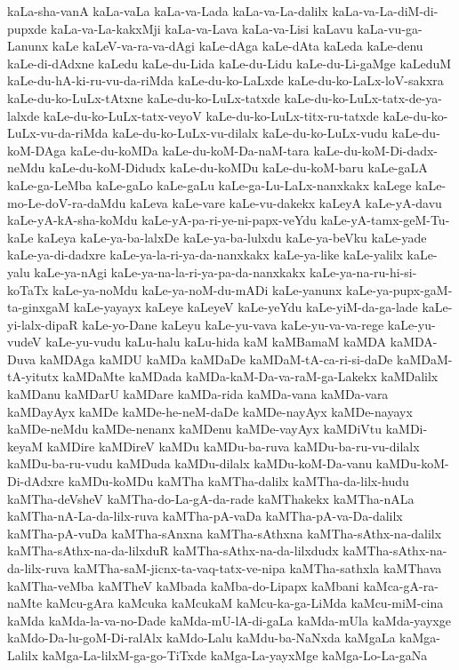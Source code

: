 {kaLa-sha-vanA
kaLa-vaLa
kaLa-va-Lada
kaLa-va-La-dalilx
kaLa-va-La-diM-di-pupxde
kaLa-va-La-kakxMji
kaLa-va-Lava
kaLa-va-Lisi
kaLavu
kaLa-vu-ga-Lanunx
kaLe
kaLeV-va-ra-va-dAgi
kaLe-dAga
kaLe-dAta
kaLeda
kaLe-denu
kaLe-di-dAdxne
kaLedu
kaLe-du-Lida
kaLe-du-Lidu
kaLe-du-Li-gaMge
kaLeduM
kaLe-du-hA-ki-ru-vu-da-riMda
kaLe-du-ko-LaLxde
kaLe-du-ko-LaLx-loV-sakxra
kaLe-du-ko-LuLx-tAtxne
kaLe-du-ko-LuLx-tatxde
kaLe-du-ko-LuLx-tatx-de-ya-lalxde
kaLe-du-ko-LuLx-tatx-veyoV
kaLe-du-ko-LuLx-titx-ru-tatxde
kaLe-du-ko-LuLx-vu-da-riMda
kaLe-du-ko-LuLx-vu-dilalx
kaLe-du-ko-LuLx-vudu
kaLe-du-koM-DAga
kaLe-du-koMDa
kaLe-du-koM-Da-naM-tara
kaLe-du-koM-Di-dadx-neMdu
kaLe-du-koM-Didudx
kaLe-du-koMDu
kaLe-du-koM-baru
kaLe-gaLA
kaLe-ga-LeMba
kaLe-gaLo
kaLe-gaLu
kaLe-ga-Lu-LaLx-nanxkakx
kaLege
kaLe-mo-Le-doV-ra-daMdu
kaLeva
kaLe-vare
kaLe-vu-dakekx
kaLeyA
kaLe-yA-davu
kaLe-yA-kA-sha-koMdu
kaLe-yA-pa-ri-ye-ni-papx-veYdu
kaLe-yA-tamx-geM-Tu-kaLe
kaLeya
kaLe-ya-ba-lalxDe
kaLe-ya-ba-lulxdu
kaLe-ya-beVku
kaLe-yade
kaLe-ya-di-dadxre
kaLe-ya-la-ri-ya-da-nanxkakx
kaLe-ya-like
kaLe-yalilx
kaLe-yalu
kaLe-ya-nAgi
kaLe-ya-na-la-ri-ya-pa-da-nanxkakx
kaLe-ya-na-ru-hi-si-koTaTx
kaLe-ya-noMdu
kaLe-ya-noM-du-mADi
kaLe-yanunx
kaLe-ya-pupx-gaM-ta-ginxgaM
kaLe-yayayx
kaLeye
kaLeyeV
kaLe-yeYdu
kaLe-yiM-da-ga-lade
kaLe-yi-lalx-dipaR
kaLe-yo-Dane
kaLeyu
kaLe-yu-vava
kaLe-yu-va-va-rege
kaLe-yu-vudeV
kaLe-yu-vudu
kaLu-halu
kaLu-hida
kaM
kaMBamaM
kaMDA
kaMDA-Duva
kaMDAga
kaMDU
kaMDa
kaMDaDe
kaMDaM-tA-ca-ri-si-daDe
kaMDaM-tA-yitutx
kaMDaMte
kaMDada
kaMDa-kaM-Da-va-raM-ga-Lakekx
kaMDalilx
kaMDanu
kaMDarU
kaMDare
kaMDa-rida
kaMDa-vana
kaMDa-vara
kaMDayAyx
kaMDe
kaMDe-he-neM-daDe
kaMDe-nayAyx
kaMDe-nayayx
kaMDe-neMdu
kaMDe-nenanx
kaMDenu
kaMDe-vayAyx
kaMDiVtu
kaMDi-keyaM
kaMDire
kaMDireV
kaMDu
kaMDu-ba-ruva
kaMDu-ba-ru-vu-dilalx
kaMDu-ba-ru-vudu
kaMDuda
kaMDu-dilalx
kaMDu-koM-Da-vanu
kaMDu-koM-Di-dAdxre
kaMDu-koMDu
kaMTha
kaMTha-dalilx
kaMTha-da-lilx-hudu
kaMTha-deVsheV
kaMTha-do-La-gA-da-rade
kaMThakekx
kaMTha-nALa
kaMTha-nA-La-da-lilx-ruva
kaMTha-pA-vaDa
kaMTha-pA-va-Da-dalilx
kaMTha-pA-vuDa
kaMTha-sAnxna
kaMTha-sAthxna
kaMTha-sAthx-na-dalilx
kaMTha-sAthx-na-da-lilxduR
kaMTha-sAthx-na-da-lilxdudx
kaMTha-sAthx-na-da-lilx-ruva
kaMTha-saM-jicnx-ta-vaq-tatx-ve-nipa
kaMTha-sathxla
kaMThava
kaMTha-veMba
kaMTheV
kaMbada
kaMba-do-Lipapx
kaMbani
kaMca-gA-ra-naMte
kaMcu-gAra
kaMcuka
kaMcukaM
kaMcu-ka-ga-LiMda
kaMcu-miM-cina
kaMda
kaMda-la-va-no-Dade
kaMda-mU-lA-di-gaLa
kaMda-mUla
kaMda-yayxge
kaMdo-Da-lu-goM-Di-ralAlx
kaMdo-Lalu
kaMdu-ba-NaNxda
kaMgaLa
kaMga-Lalilx
kaMga-La-lilxM-ga-go-TiTxde
kaMga-La-yayxMge
kaMga-Lo-La-gaNa
}
